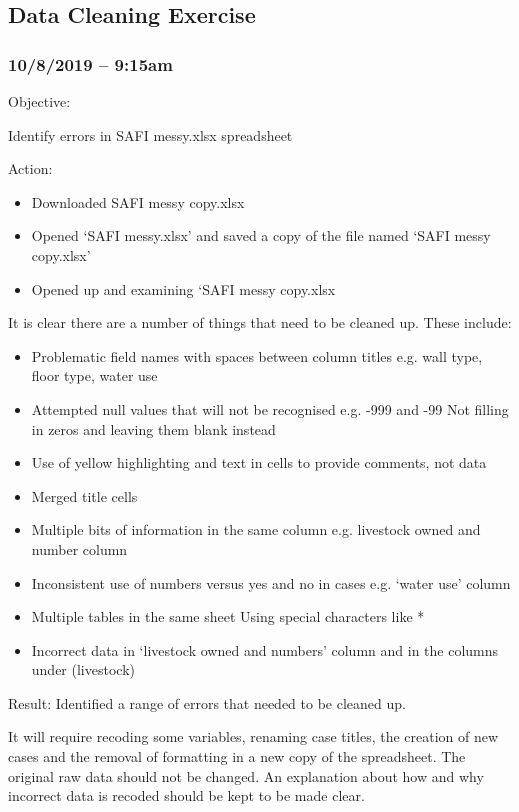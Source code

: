\documentclass{article}
\begin{document}
\subsection{Data Cleaning Exercise}
\subsubsection*{10/8/2019 – 9:15am}
Objective:\par
Identify errors in SAFI messy.xlsx spreadsheet\par
Action:
\begin{itemize}
\item Downloaded SAFI messy copy.xlsx
\item Opened ‘SAFI messy.xlsx’ and saved a copy of the file named ‘SAFI messy copy.xlsx’
\item Opened up and examining ‘SAFI messy copy.xlsx
\end{itemize}
It is clear there are a number of things that need to be cleaned up. These include:\par
\begin{itemize}
\item Problematic field names with spaces between column titles e.g. wall type, floor type, water use
\item Attempted null values that will not be recognised e.g. -999 and -99 
Not filling in zeros and leaving them blank instead
\item Use of yellow highlighting and text in cells to provide comments, not data
\item Merged title cells
\item Multiple bits of information in the same column e.g. livestock owned and number column
\item Inconsistent use of numbers versus yes and no in cases e.g. ‘water use’ column
\item Multiple tables in the same sheet
Using special characters like *
\item Incorrect data in ‘livestock owned and numbers’ column and in the columns under (livestock)
\end{itemize}
Result: Identified a range of errors that needed to be cleaned up.\par
It will require recoding some variables, renaming case titles, the creation of new cases and the removal of formatting in a new copy of the spreadsheet. The original raw data should not be changed. An explanation about how and why incorrect data is recoded should be kept to be made clear.\par
\end{document}
